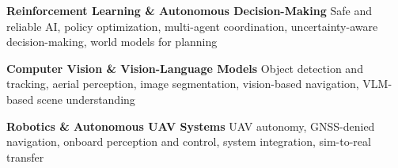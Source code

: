 
\begin{cventries}

\cventry
  {\textbf{Reinforcement Learning \& Autonomous Decision-Making}}
  {}
  {}
  {}
  {
  Safe and reliable AI, policy optimization, multi-agent coordination, uncertainty-aware decision-making, world models for planning
  }

\cventry
  {\textbf{Computer Vision \& Vision-Language Models}}
  {}
  {}
  {}
  {
  Object detection and tracking, aerial perception, image segmentation, vision-based navigation, VLM-based scene understanding
  }

\cventry
  {\textbf{Robotics \& Autonomous UAV Systems}}
  {}
  {}
  {}
  {
  UAV autonomy, GNSS-denied navigation, onboard perception and control, system integration, sim-to-real transfer
  }

\end{cventries}